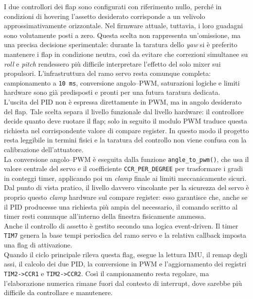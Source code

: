 \documentclass[11pt]{report}
\begin{document}
	I due controllori dei flap sono configurati con riferimento nullo, perché in condizioni di hovering l'assetto desiderato corrisponde a un velivolo approssimativamente orizzontale. Nel firmware attuale, tuttavia, i loro guadagni sono volutamente posti a zero. Questa scelta non rappresenta un'omissione, ma una precisa decisione sperimentale: durante la taratura dello \textit{yaw} si è preferito mantenere i flap in condizione neutra, così da evitare che correzioni simultanee su \textit{roll} e \textit{pitch} rendessero più difficile interpretare l'effetto del solo mixer sui propulsori. L'infrastruttura del ramo servo resta comunque completa: campionamento a \texttt{10 ms}, conversione angolo--PWM, saturazioni logiche e limiti hardware sono già predisposti e pronti per una futura taratura dedicata.\\
	L'uscita del PID non è espressa direttamente in PWM, ma in angolo desiderato del flap. Tale scelta separa il livello funzionale dal livello hardware: il controllore decide quanto deve ruotare il flap; solo in seguito il modulo PWM traduce questa richiesta nel corrispondente valore di compare register. In questo modo il progetto resta leggibile in termini fisici e la taratura del controllo non viene confusa con la calibrazione dell'attuatore.\\
	La conversione angolo--PWM è eseguita dalla funzione \texttt{angle\_to\_pwm()}, che usa il valore centrale del servo e il coefficiente \texttt{CCR\_PER\_DEGREE} per trasformare i gradi in conteggi timer, applicando poi un \textit{clamp} finale ai limiti meccanicamente sicuri. Dal punto di vista pratico, il livello davvero vincolante per la sicurezza del servo è proprio questo \textit{clamp} hardware sul compare register: esso garantisce che, anche se il PID producesse una richiesta più ampia del necessario, il comando scritto al timer resti comunque all'interno della finestra fisicamente ammessa.\\
	Anche il controllo di assetto è gestito secondo una logica event-driven. Il timer \texttt{TIM7} genera la base tempi periodica del ramo servo e la relativa callback imposta una flag di attivazione.\\
	Quando il ciclo principale rileva questa flag, esegue la lettura IMU, il remap degli assi, il calcolo dei due PID, la conversione in PWM e l'aggiornamento dei registri \texttt{TIM2->CCR1} e \texttt{TIM2->CCR2}. Così il campionamento resta regolare, ma l'elaborazione numerica rimane fuori dal contesto di interrupt, dove sarebbe più difficile da controllare e manutenere.
\end{document}
